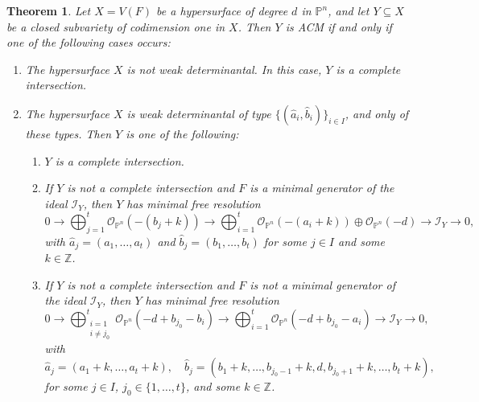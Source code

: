 \documentclass[12pt,reqno]{amsart}
\theoremstyle{plain}
\newtheorem{thm}[theorem]{Theorem}
\theoremstyle{definition}
\theoremstyle{remark}
\theoremstyle{definition}
\newcommand{\PP}{\mathds{P}}
\newcommand{\ii}{\mathscr{I}}
\newcommand{\oo}{\mathcal{O}}
\begin{document}
\begin{thm}
Let $X=V(F)$ be a hypersurface of degree $d$ in $\PP^{n}$, and let $Y\subseteq X$ be a closed subvariety of codimension one in $X$. Then $Y$ is ACM if and only if one of the following cases occurs:
\begin{enumerate}
    \item The hypersurface $X$ is not weak determinantal. In this case, $Y$ is a complete intersection.

    \item The hypersurface $X$ is weak determinantal of type $\{(\hat{a}_{i},\hat{b}_{i})\}_{i\in I}$, and only of these types. Then $Y$ is one of the following:
    \begin{enumerate}[label=(\roman*)]
        \item $Y$ is a complete intersection.

        \item If $Y$ is not a complete intersection and $F$ is a minimal generator of the ideal $\ii_{Y}$, then $Y$ has minimal free resolution
        \[
        0 \to \bigoplus_{j=1}^{t} \oo_{\PP^{n}}(-(b_{j}+k))
        \to \bigoplus_{i=1}^{t} \oo_{\PP^{n}}(-(a_{i}+k)) \oplus \oo_{\PP^{n}}(-d)
        \to \ii_{Y} \to 0,
        \]
        with $\hat{a}_{j}=(a_{1},\ldots,a_{t})$ and $\hat{b}_{j}=(b_{1},\ldots,b_{t})$ for some $j\in I$ and some $k\in\mathds{Z}$.

        \item If $Y$ is not a complete intersection and $F$ is not a minimal generator of the ideal $\ii_{Y}$, then $Y$ has minimal free resolution
        \[
        0 \to \bigoplus_{\substack{i=1\\ i\neq j_{0}}}^{t}
        \oo_{\PP^{n}}(-d+b_{j_{0}}-b_{i})
        \to \bigoplus_{i=1}^{t}
        \oo_{\PP^{n}}(-d+b_{j_{0}}-a_{i})
        \to \ii_{Y} \to 0,
        \]
        with
        \[
        \hat{a}_{j}=(a_{1}+k,\ldots,a_{t}+k), \quad
        \hat{b}_{j}=(b_{1}+k,\ldots,b_{j_{0}-1}+k,d,b_{j_{0}+1}+k,\ldots,b_{t}+k),
        \]
        for some $j\in I$, $j_{0}\in\{1,\ldots,t\}$, and some $k\in\mathds{Z}$.
    \end{enumerate}
\end{enumerate}
\end{thm}
\end{document}
